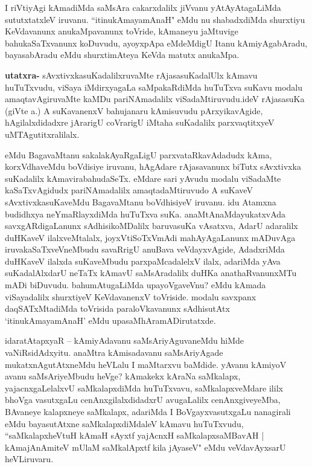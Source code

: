 \begin{artha}
I riVtiyAgi kAmadiMda saMsAra cakarxdalilx jiVvanu yAtAyAtagaLiMda sututxtatxleV iruvanu. ``itinukAmayamAnaH" eMdu nu shabadxdiMda shurxtiyu KeVdavanunx anukaMpavanunx toVride, kAmaneyu jaMtuvige bahukaSaTxvanunx koDuvudu, ayoyxpApa eMdeMdigU Itanu kAmiyAgabAradu, bayasabAradu eMdu shurxtimAteya KeVda matutx anukaMpa.
\end{artha}

\begin{artha}
\textbf{utatxra-} sAvxtivxkasuKadalilxruvaMte rAjasasuKadalUlx kAmavu huTuTxvudu, viSaya iMdirxyagaLa saMpakaRdiMda huTuTxva suKavu modalu amaqtavAgiruvaMte kaMDu pariNAmadalilx viSadaMtiruvudu.ideV rAjasasuKa (giVte a.) A suKavanenxV bahujanaru kAmisuvudu pArxyikavAgide, hAgilalxdidadxre jArarigU coVrarigU iMtaha suKadalilx parxvaqtitxyeV uMTAgutitxralilalx. 
\end{artha}

\begin{artha}
eMdu BagavaMtanu sakalakAyaRgaLigU parxvataRkavAdadudx kAma, korxVdhaveMdu boVdisiye iruvanu, hAgAdare rAjasavanunx biTutx sAvxtivxka suKadalilx kAmavirabahudaSeTx. eMdare sari yAvudu modalu viSadaMte kaSaTxvAgidudx pariNAmadalilx amaqtadaMtiruvudo A suKaveV sAvxtivxkasuKaveMdu BagavaMtanu boVdhisiyeV iruvanu. idu Atamxna budidhxya neYmaRlayxdiMda huTuTxva suKa. anaMtAnaMdayukatxvAda savxgARdigaLanunx sAdhisikoMDalilx baruvasuKa vAsatxva, AdarU adaralilx duHKaveV ilalxveMtalalx, joyxVtiSoTxVmAdi mahAyAgaLanunx mADuvAga iruvakaSaTxveVneMbudu savaRrigU anuBava veVdayxvAgide, AdadxriMda duHKaveV ilalxda suKaveMbudu parxpaMcadalelxV ilalx, adariMda yAva suKadalAlxdarU neTaTx kAmavU saMsAradalilx duHKa anathaRvanunxMTu mADi biDuvudu. bahumAtugaLiMda upayoVgaveVnu? eMdu kAmada viSayadalilx shurxtiyeV KeVdavanenxV toVriside. modalu savxpanx daqSATxMtadiMda toVrisida paraloVkavanunx sAdhisutAtx `itinukAmayamAnaH' eMdu upasaMhAramADirutatxde.
\end{artha}

\begin{artha}
idaratAtapxyaR -- kAmiyAdavanu saMsAriyAguvaneMdu hiMde vaNiRsidAdxyitu. anaMtra kAmisadavanu saMsAriyAgade mukatxnAgutAtxneMdu heVLalu I maMtarxvu baMdide.
yAvanu kAmiyoV avanu saMsAriyeMbudu heVge? kAmakekx kAraNa saMkalapx, yajacnxgaLelalxvU saMkalapxdiMda huTuTxvavu, saMkalapxveMdare ililx bhoVga vasutxgaLu cenAnxgilalxdidadxrU avugaLalilx cenAnxgiveyeMba, BAvaneye kalapxneye saMkalapx, adariMda I BoVgayxvasutxgaLu nanagirali eMdu bayasutAtxne saMkalapxdiMdaleV kAmavu huTuTxvudu, ``saMkalapxheVtuH kAmaH sAyxtf yajAcnxH saMkalapxsaMBavAH | kAmajAnAmiteV mUlaM saMkalApxtf kila jAyaseV" eMdu veVdavAyxsarU heVLiruvaru.
\end{artha}


